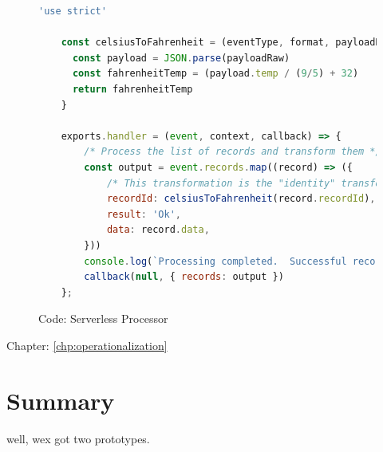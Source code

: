 \begin{figure}[ht]
    \begin{lstlisting}[language=js,firstnumber=1]
    'use strict'

    const celsiusToFahrenheit = (eventType, format, payloadRaw) => {
      const payload = JSON.parse(payloadRaw)
      const fahrenheitTemp = (payload.temp / (9/5) + 32)
      return fahrenheitTemp
    }
        
    exports.handler = (event, context, callback) => {
        /* Process the list of records and transform them */
        const output = event.records.map((record) => ({
            /* This transformation is the "identity" transformation, the data is left intact */
            recordId: celsiusToFahrenheit(record.recordId),
            result: 'Ok',
            data: record.data,
        }))
        console.log(`Processing completed.  Successful records \${output.length}.`)
        callback(null, { records: output })
    };
    \end{lstlisting}\centering
    \caption{Code: Serverless Processor}
    \label{code:slProcessor}
\end{figure}

Chapter: \ref{chp:operationalization}








\section{Summary}

well, wex got two prototypes.